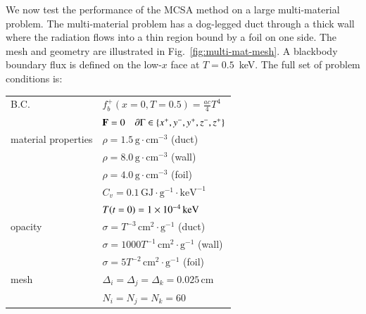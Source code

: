 \documentclass[preprint,12pt]{elsarticle}
\newcommand{\Cv}{\ensuremath{C_{v}}}
\newcommand{\Di}{\ensuremath{\Delta_i}}
\newcommand{\Dj}{\ensuremath{\Delta_j}}
\newcommand{\Dk}{\ensuremath{\Delta_k}}
\begin{document}
We now test the performance of the MCSA method on a large multi-material
problem.  The multi-material problem has a dog-legged duct through a thick
wall where the radiation flows into a thin region bound by a foil on one side.
The mesh and geometry are illustrated in Fig.~\ref{fig:multi-mat-mesh}.  A
blackbody boundary flux is defined on the low-$x$ face at $T=0.5$~keV.  The
full set of problem conditions is:
\begin{center}
  \begin{tabular}{ll}\hline
    B.C. & $f_b^{+}(x=0,T=0.5) = \frac{ac}{4}T^4$\\ & $\mathbf{F} =
    0\quad \partial\Gamma \in \{x^{+}, y^{-}, y^{+}, z^{-}, z^{+}\}$
    \\  material properties & $\rho =
    1.5\,\text{g}\cdot\text{cm}^{-3}$ (duct) \\ & $\rho =
    8.0\,\text{g}\cdot\text{cm}^{-3}$ (wall) \\ & $\rho =
    4.0\,\text{g}\cdot\text{cm}^{-3}$ (foil) \\ & $\Cv =
    0.1\,\text{GJ}\cdot\text{g}^{-1}\cdot\text{keV}^{-1}$\\ &
    $T(t=0) = 1\times 10^{-4}\,\text{keV}$\\  opacity & $\sigma =
    T^{-3}\,\text{cm}^2\cdot\text{g}^{-1}$ (duct) \\ & $\sigma =
    1000T^{-1}\,\text{cm}^2\cdot\text{g}^{-1}$ (wall) \\ & $\sigma =
    5T^{-2}\,\text{cm}^2\cdot\text{g}^{-1}$ (foil) \\  mesh & $\Di =
    \Dj = \Dk = 0.025\,\text{cm}$ \\ & $N_i = N_j = N_k = 60$
    \\ \hline
  \end{tabular}
\end{center}
\end{document}
